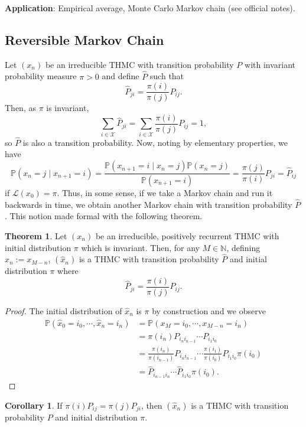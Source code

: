 \documentclass[]{article}
\theoremstyle{definition}
\newtheorem{theorem}{Theorem}
\newtheorem{corollary}{Corollary}[theorem]
\theoremstyle{definition}
\begin{document}
\textbf{Application}: 
Empirical average, Monte Carlo Markov chain (see official notes).

\subsection{Reversible Markov Chain}

Let \((x_n)\) be an irreducible THMC with transition probability \(P\) with 
invariant probability measure \(\pi > 0\) and define \(\hat P\) such that
\[\hat P_{ji} = \frac{\pi(i)}{\pi(j)} P_{ij}.\]
Then, as \(\pi\) is invariant,
\[\sum_{i \in \mathcal{X}} \hat P_{ji} = 
  \sum_{i \in \mathcal{X}} \frac{\pi(i)}{\pi(j)} P_{ij} = 1,\]
so \(\hat P\) is also a transition probability. Now, noting by elementary 
properties, we have 
\[\mathbb{P}(x_n = j \mid x_{n + 1} = i) = 
  \frac{\mathbb{P}(x_{n + 1} = i \mid x_n = j)\mathbb{P}(x_n = j)}{\mathbb{P}(x_{n + 1} = i)}
  = \frac{\pi(j)}{\pi(i)}P_{ji} = \hat P_{ij}\]
if \(\mathcal{L}(x_0) = \pi\). Thus, in some sense, if we take a Markov 
chain and run it backwards in time, we obtain another Markov chain with transition 
probability \(\hat P\). This notion made formal with the following theorem.

\begin{theorem}
  Let \((x_n)\) be an irreducible, positively recurrent THMC with initial 
  distribution \(\pi\) which is invariant. Then, for any \(M \in \mathbb{N}\), 
  defining \(\hat x_n := x_{M - n}\), \((\hat x_n)\) is a THMC with transition 
  probability \(\hat P\) and initial distribution \(\pi\) where 
  \[\hat P_{ji} = \frac{\pi(i)}{\pi(j)}P_{ij}.\]
\end{theorem}
\begin{proof}
  The initial distribution of \(\hat x_n\) is \(\pi\) by construction and we 
  observe 
  \[\begin{split}
    \mathbb{P}(\hat x_0 = i_0, \cdots, \hat x_n = i_n) & = 
    \mathbb{P}(x_M = i_0, \cdots, x_{M - n} = i_n)\\
    & = \pi(i_n) P_{i_ni_{n - 1}} \cdots P_{i_1i_0}\\
    & = \frac{\pi(i_n)}{\pi(i_{n - 1})}P_{i_ni_{n - 1}} \cdots 
      \frac{\pi(i_1)}{\pi(i_0)}P_{i_1i_0} \pi(i_0)\\
    & = \hat P_{i_{n - 1} i_n} \cdots \hat P_{i_1 i_0} \pi(i_0).
  \end{split}\]
\end{proof}

\begin{corollary}
  If \(\pi(i)P_{ij} = \pi(j)P_{ji}\), then \((\hat x_n)\) is a THMC with 
  transition probability \(P\) and initial distribution \(\pi\).
\end{corollary}
\end{document}
